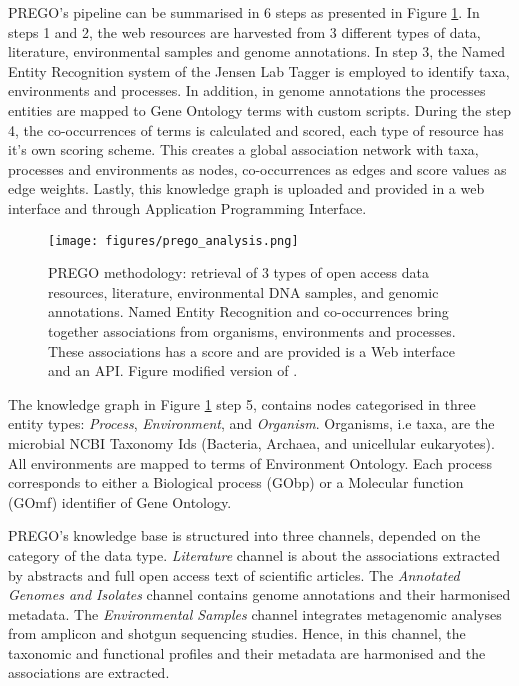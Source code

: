 PREGO's pipeline can be summarised in 6 steps as presented in Figure \ref{fig:prego-pipeline}.
In steps 1 and 2, the web resources are harvested from 3 different types of data,
literature, environmental samples and genome annotations. 
In step 3, the Named Entity Recognition system of the Jensen Lab Tagger is employed \parencite{jensen2016one}
to identify taxa, environments and processes. In addition, in genome annotations
the processes entities are mapped to Gene Ontology terms with custom scripts. 
During the step 4, the co-occurrences of terms is calculated and scored,
each type of resource has it's own scoring scheme. 
This creates a global association network with taxa, processes and environments as 
nodes, co-occurrences as edges and score values as edge weights. 
Lastly, this knowledge graph is uploaded and provided in a web interface 
and through Application Programming Interface.

   \begin{figure}[hbt!]
      \centering
      \texttt{[image: figures/prego\_analysis.png]}
      \caption[PREGO analysis methodology]{
         PREGO methodology: retrieval of 3 types of open access data resources, literature, environmental DNA samples, and genomic annotations. 
         Named Entity Recognition and co-occurrences bring together associations from organisms, environments and processes. 
         These associations has a score and are provided is a Web interface and an API. Figure modified version of \parencite{microorganisms10020293}.
      }
      \label{fig:prego-pipeline}
   \end{figure}

The knowledge graph in Figure \ref{fig:prego-pipeline} step 5, contains
nodes categorised in three entity types: \textit{Process}, \textit{Environment}, and \textit{Organism}. 
Organisms, i.e taxa, are the microbial NCBI Taxonomy Ids (Bacteria, Archaea, and unicellular eukaryotes).
All environments are mapped to terms of Environment Ontology. 
Each process corresponds to either a Biological process (GObp) or a Molecular function (GOmf) identifier of Gene Ontology. 

PREGO's knowledge base is structured into three channels, depended on the category of the data type.
\textit{Literature} channel is about the associations extracted by abstracts and full open access text of scientific articles.
The \textit{Annotated Genomes and Isolates} channel contains genome annotations and their harmonised metadata.
The \textit{Environmental Samples} channel integrates metagenomic analyses from amplicon and shotgun sequencing studies. 
Hence, in this channel, the taxonomic and functional profiles and their metadata are harmonised and the associations are extracted.

